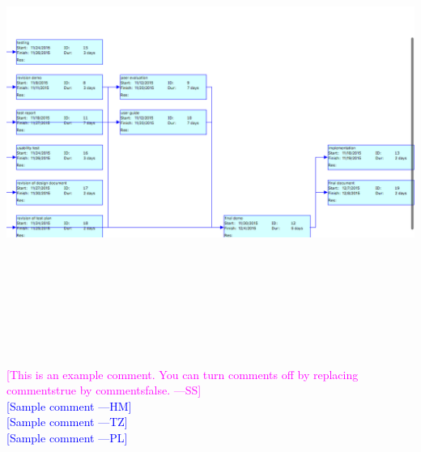 \documentclass[titlepage]{article}
\newcommand{\authornote}[3]{\textcolor{#1}{[#3 ---#2]}}
\newcommand{\authornote}[3]{}
\newcommand{\wss}[1]{\authornote{magenta}{SS}{#1}}
\newcommand{\hm}[1]{\authornote{blue}{HM}{#1}} %
\newcommand{\tz}[1]{\authornote{blue}{TZ}{#1}} %
\newcommand{\pl}[1]{\authornote{blue}{PL}{#1}} %
\begin{document}
\includegraphics[width=20cm, height=15cm]{pert2}






\noindent \wss{This is an example comment.  You can turn comments off by replacing
  commentstrue by commentsfalse.}\\
\hm{Sample comment}\\
\tz{Sample comment}\\
\pl{Sample comment}
\end{document}
